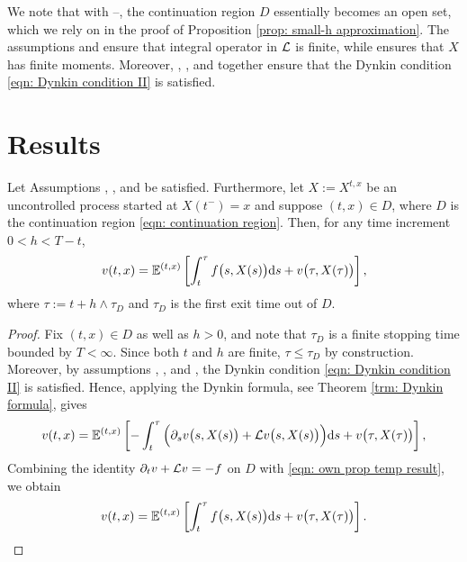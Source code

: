 We note that with --, the continuation region $D$ essentially becomes an open set, which we rely on in the proof of Proposition \ref{prop: small-h approximation}. The assumptions  and  ensure that integral operator in $\mathcal{L}$ is finite, while  ensures that $X$ has finite moments. Moreover, , , and  together ensure that the Dynkin condition \eqref{eqn: Dynkin condition II} is satisfied.

\section{Results}
\label{appendix: results C}
\begin{proposition}
\label{prop: dynamic programming with h}
    Let Assumptions , , and  be satisfied. Furthermore, let $X:=X^{t,x}$ be an uncontrolled process started at $X(t^-)=x$ and suppose $(t,x) \in D$, where $D$ is the continuation region \eqref{eqn: continuation region}. Then, for any time increment $0<h<T-t$, 
    \begin{equation*}
        v(t,x) = \mathbb{E}^{(t,x)} \left[ \int_t^{\tau} f\big(s,X(s)\big) \mathrm{d} s + v\big(\tau, X(\tau)\big) \right],
    \end{equation*}
    where $\tau:=t + h \wedge \tau_D$ and $\tau_D$ is the first exit time out of $D$. 
\end{proposition}
\begin{proof}
    Fix $(t,x) \in D$ as well as $h>0$, and note that $\tau_D$ is a finite stopping time bounded by $T<\infty$. Since both $t$ and $h$ are finite, $\tau \leq \tau_D$ by construction. Moreover, by assumptions , , and , the Dynkin condition \eqref{eqn: Dynkin condition II} is satisfied. Hence, applying the Dynkin formula, see Theorem \ref{trm: Dynkin formula}, gives 
    \begin{equation}
        v(t,x) = \mathbb{E}^{(t,x)} \left[ - \int_t^\tau \Big(  \partial_s v\big(s,X(s)\big) + \mathcal{L} v\big(s,X(s)\big) \Big) \mathrm{d} s + v\big(\tau,X(\tau)\big) \right],
        \label{eqn: own prop temp result}
    \end{equation}
    Combining the identity $\partial_t v + \mathcal{L} v = -f$ on $D$ with \eqref{eqn: own prop temp result}, we obtain
    \begin{equation*}
        v(t,x) = \mathbb{E}^{(t,x)} \left[ \int_t^\tau f\big(s,X(s)\big)\mathrm{d} s + v\big( \tau,X(\tau)\big) \right].
        \qedhere
    \end{equation*}
\end{proof}

